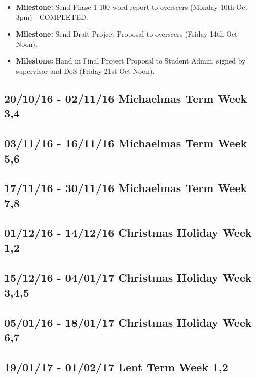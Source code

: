 \documentclass[a4paper,12pt]{article}
\begin{document}
      \begin{itemize}
        \item[] \textbf{Milestone:} Send Phase 1 100-word report to overseers (Monday 10th Oct 3pm) - COMPLETED.

        \item[] \textbf{Milestone:} Send Draft Project Proposal to overseers (Friday 14th Oct Noon).

        \item[] \textbf{Milestone:} Hand in Final Project Proposal to Student Admin, signed by supervisor and DoS (Friday 21st Oct Noon).
    \end{itemize}

    \subsection*{20/10/16 - 02/11/16 \hfill Michaelmas Term Week 3,4}

    \subsection*{03/11/16 - 16/11/16 \hfill Michaelmas Term Week 5,6}


    \subsection*{17/11/16 - 30/11/16 \hfill Michaelmas Term  Week 7,8}


    \subsection*{01/12/16 - 14/12/16 \hfill Christmas Holiday Week 1,2}


    \subsection*{15/12/16 - 04/01/17 \hfill Christmas Holiday Week  3,4,5}


    \subsection*{05/01/16 - 18/01/17 \hfill Christmas Holiday Week 6,7}


    \subsection*{19/01/17 - 01/02/17 \hfill Lent Term Week 1,2}
\end{document}
